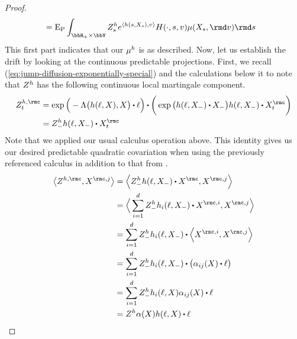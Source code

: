 \begin{proof}
\begin{align*}
    &= \Exp_\Prb \int_{\bbR_+ \times \vecSpace} \mgDensity^\twistFunc_s e^\prj{\twistFunc(s, \X_s)}{\markVar} H(\cdot, s, \markVar) \affJump(\X_s, \rmd\markVar) \rmd s  
  \end{align*}
  This first part indicates that our $\mu^h$ is as described.
  Now, let us establish the drift by looking at the continuous predictable projections.
  First, we recall (\ref{eq:jump-diffusion-exponentially-special}) and the calculations below it to note that $Z^h$ has the following continuous local martingale component.
  \begin{align*}
    \mgDensity^{\twistFunc,\rmc}_t 
    &= \exp\Big( -\ode\big(\twistFunc(\leb, \X), \X\big) \shortInt \leb \Big) \shortInt \bigg( \exp\big( \twistFunc(\leb, \X_-) \shortInt \X_- \big) \twistFunc(\leb, \X_-) \shortInt \X^\rmc_t\bigg)  \\
    &= \mgDensity^\twistFunc_- \twistFunc(\leb, \X_-) \shortInt \X^\rmc_t
  \end{align*}
  Note that we applied our usual calculus operation \cite[Remark I.4.37]{jacod2003} above.
  This identity gives us our desired predictable quadratic covariation when using the previously referenced calculus in addition to that from \cite[Theorem I.4.40]{jacod2003}.
  \begin{align*}
    \bprj{\mgDensity^{\twistFunc,\rmc}}{\X^{\rmc,j}}
    &= \Bprj{\mgDensity^\twistFunc_- \twistFunc(\leb, \X_-) \shortInt \X^\rmc}{\X^{\rmc,j}} \\
    &= \Bprj{\sum_{i=1}^d \mgDensity^\twistFunc_- \twistFunc_i(\leb, \X_-) \shortInt \X^{\rmc,i}}{\X^{\rmc,j}} \\
    &= \sum_{i=1}^d \mgDensity^\twistFunc_- \twistFunc_i(\leb, \X_-) \shortInt \Bprj{\X^{\rmc,i}}{\X^{\rmc,j}} \\
    &= \sum_{i=1}^d \mgDensity^\twistFunc_- \twistFunc_i(\leb, \X_-) \shortInt \big( \affDiff_{ij}(\X) \shortInt \leb\big) \\
    &= \sum_{i=1}^d \mgDensity^\twistFunc_- \twistFunc_i(\leb, \X) \affDiff_{ij}(\X) \shortInt \leb \\
    &= \mgDensity^\twistFunc \affDiff(\X) \twistFunc(\leb, \X) \shortInt \leb \\
  \end{align*}
\end{proof}
